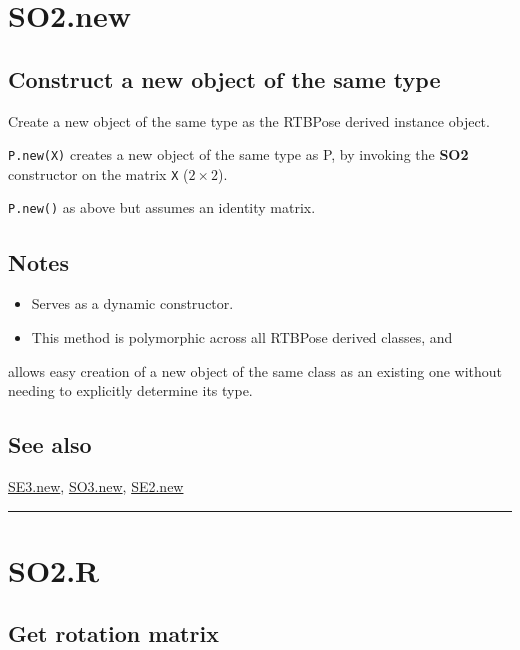 \hypertarget{SO2.new}{\section*{SO2.new}}
\subsection*{Construct a new object of the same type}


Create a new object of the same type as the RTBPose derived instance object.



\texttt{P.new(X)} creates a new object of the same type as P, by invoking the \textbf{\color{red} SO2} constructor on the matrix
\texttt{X} ($2 \times 2$).



\texttt{P.new()} as above but assumes an identity matrix.


\subsection*{Notes}
\begin{itemize}
  \item Serves as a dynamic constructor.
  \item This method is polymorphic across all RTBPose derived classes, and
\end{itemize}


allows easy creation of a new object of the same class as an existing
one without needing to explicitly determine its type.


\subsection*{See also}


\hyperlink{SE3.new}{\color{blue} SE3.new}, \hyperlink{SO3.new}{\color{blue} SO3.new}, \hyperlink{SE2.new}{\color{blue} SE2.new}

\vspace{1.5ex}\hrule

\hypertarget{SO2.R}{\section*{SO2.R}}
\subsection*{Get rotation matrix}


